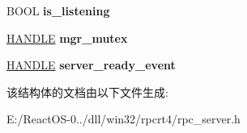 \begin{DoxyCompactItemize}
\mbox{\label{struct___rpc_server_protseq_ad4a49c96b802c5600cc103f86a9d1863}} 
B\+O\+OL {\bfseries is\+\_\+listening}
\item 
\mbox{\label{struct___rpc_server_protseq_a850ff32cb80ed8f26388c47980c0c1cf}} 
\hyperlink{interfacevoid}{H\+A\+N\+D\+LE} {\bfseries mgr\+\_\+mutex}
\item 
\mbox{\label{struct___rpc_server_protseq_af578be9850821a80f1ba6a99ec8cd247}} 
\hyperlink{interfacevoid}{H\+A\+N\+D\+LE} {\bfseries server\+\_\+ready\+\_\+event}
\end{DoxyCompactItemize}


该结构体的文档由以下文件生成\+:\begin{DoxyCompactItemize}
\item 
E\+:/\+React\+O\+S-\/0../dll/win32/rpcrt4/rpc\+\_\+server.\+h\end{DoxyCompactItemize}
